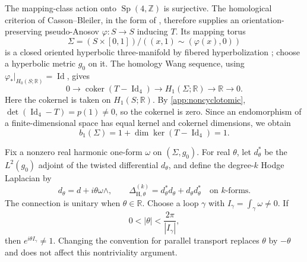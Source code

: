 \documentclass[11pt,letterpaper,reqno]{amsart}
\theoremstyle{remark}
\newcommand{\Id}{\operatorname{Id}}
\begin{document}
The mapping-class action onto $\operatorname{Sp}(4,\mathbb Z)$ is
surjective. The homological criterion of Casson--Bleiler, in the form
of \cite[Propositions 1--2]{MS}, therefore supplies an
orientation-preserving pseudo-Anosov $\varphi:S\to S$ inducing $T$.
Its mapping torus
\begin{equation}\label{app:mappingtorus}
 \Sigma=(S\times[0,1])/((x,1)\sim(\varphi(x),0))
\end{equation}
is a closed oriented hyperbolic three-manifold by fibered
hyperbolization \cite{Thurston}; choose a hyperbolic metric $g_0$ on it.
The homology Wang sequence, using
$\varphi_*|_{H_0(S;\mathbb R)}=\Id$, gives
\begin{equation}\label{app:wang}
 0\longrightarrow\operatorname{coker}(T-\Id_4)
 \longrightarrow H_1(\Sigma;\mathbb R)
 \longrightarrow\mathbb R\longrightarrow0.
\end{equation}
Here the cokernel is taken on $H_1(S;\mathbb R)$. By
\eqref{app:noncyclotomic}, $\det(\Id_4-T)=p(1)\ne0$, so the
cokernel is zero. Since an endomorphism of a finite-dimensional space
has equal kernel and cokernel dimensions, we obtain
\begin{equation}\label{app:b1}
 b_1(\Sigma)=1+\dim\ker(T-\Id_4)=1.
\end{equation}



Fix a nonzero real harmonic one-form $\omega$ on $(\Sigma,g_0)$. For real
$\theta$, let $d_\theta^*$ be the $L^2(g_0)$ adjoint of the twisted
differential $d_\theta$, and define the degree-$k$ Hodge Laplacian by
\begin{equation}\label{app:hodgeoperators}
 d_\theta=d+i\theta\omega\wedge,
 \qquad
 \Delta_{\mathrm H,\theta}^{(k)}
 =d_\theta^*d_\theta+d_\theta d_\theta^*
 \quad\text{on $k$-forms}.
\end{equation}
The connection is unitary when $\theta\in\mathbb R$. Choose a loop
$\gamma$ with $I_\gamma=\int_\gamma\omega\ne0$. If
\begin{equation}\label{app:nontrivialcharacter}
 0<|\theta|<\frac{2\pi}{|I_\gamma|},
\end{equation}
then $e^{i\theta I_\gamma}\ne1$. Changing the convention for parallel
transport replaces $\theta$ by $-\theta$ and does not affect this
nontriviality argument.
\end{document}
